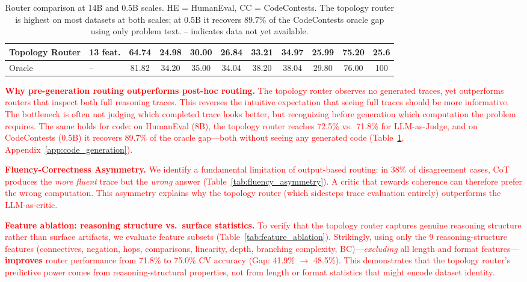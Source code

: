 \documentclass[11pt]{article}
\begin{document}
{\begin{table}[ht]
{\begin{tabular}{llccccccccc}
\textbf{Topology Router} & \textbf{13 feat.} & \textbf{64.74} & 24.98 & 30.00 & \textbf{26.84} & \textbf{33.21} & \textbf{34.97} & 25.99 & \textbf{75.20} & \textbf{25.6} \\
\midrule
Oracle & -- & 81.82 & 34.20 & 35.00 & 34.04 & 38.20 & 38.04 & 29.80 & 76.00 & 100 \\
\bottomrule
\end{tabular}}
\caption{Router comparison at 14B and 0.5B scales. HE = HumanEval, CC = CodeContests. The topology router is highest on most datasets at both scales; at 0.5B it recovers 89.7\% of the CodeContests oracle gap using only problem text. -- indicates data not yet available.}
\label{tab:router_14b_05b}
\end{table}


\textcolor{red}{\textbf{Why pre-generation routing outperforms post-hoc routing.}}
\textcolor{red}{The topology router observes no generated traces, yet outperforms routers that inspect both full reasoning traces. This reverses the intuitive expectation that seeing full traces should be more informative. The bottleneck is often not judging which completed trace looks better, but recognizing before generation which computation the problem requires. The same holds for code: on HumanEval (8B), the topology router reaches 72.5\% vs.\ 71.8\% for LLM-as-Judge, and on CodeContests (0.5B) it recovers 89.7\% of the oracle gap---both without seeing any generated code (Table~\ref{tab:router_14b_05b}, Appendix~\ref{app:code_generation}).}

\textcolor{red}{\textbf{Fluency-Correctness Asymmetry.}}
\textcolor{red}{We identify a fundamental limitation of output-based routing: in 38\% of disagreement cases, CoT produces the \emph{more fluent} trace but the \emph{wrong} answer (Table~\ref{tab:fluency_asymmetry}). A critic that rewards coherence can therefore prefer the wrong computation. This asymmetry explains why the topology router (which sidesteps trace evaluation entirely) outperforms the LLM-as-critic.}

\textcolor{red}{\textbf{Feature ablation: reasoning structure vs.\ surface statistics.}}
\textcolor{red}{To verify that the topology router captures genuine reasoning structure rather than surface artifacts, we evaluate feature subsets (Table~\ref{tab:feature_ablation}). Strikingly, using only the 9 reasoning-structure features (connectives, negation, hops, comparisons, linearity, depth, branching complexity, BC)---\emph{excluding} all length and format features---\textbf{improves} router performance from 71.8\% to 75.0\% CV accuracy (Gap: 41.9\% $\to$ 48.5\%). This demonstrates that the topology router's predictive power comes from reasoning-structural properties, not from length or format statistics that might encode dataset identity.}

}
\end{document}
